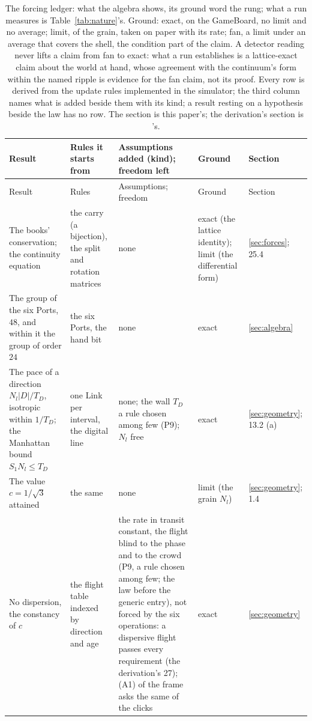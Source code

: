 {\scriptsize\setlength{\tabcolsep}{3pt}
\begin{longtable}{L{1.3in}L{1.5in}L{1.45in}L{0.85in}L{0.85in}}
\caption{\label{tab:ledger}The forcing ledger: what the algebra shows, its ground word the rung; what a run measures is Table~\ref{tab:nature}'s. Ground: exact, on the GameBoard, no limit and no average; limit, of the grain, taken on paper with its rate; fan, a limit under an average that covers the shell, the condition part of the claim. A detector reading never lifts a claim from fan to exact: what a run establishes is a lattice-exact claim about the world at hand, whose agreement with the continuum's form within the named ripple is evidence for the fan claim, not its proof. Every row is derived from the update rules implemented in the simulator; the third column names what is added beside them with its kind; a result resting on a hypothesis beside the law has no row. The section is this paper's; the derivation's section is \cite{derivations}'s.}\\
\toprule
Result & Rules it starts from & Assumptions added (kind); freedom left & Ground & Section \\
\midrule
\endfirsthead
\toprule
Result & Rules & Assumptions; freedom & Ground & Section \\
\midrule
\endhead
\bottomrule
\endlastfoot
The books' conservation; the continuity equation & the carry (a bijection), the split and rotation matrices & none & exact (the lattice identity); limit (the differential form) & \ref{sec:forces}; 25.4 \\
The group of the six Ports, $48$, and within it the group of order $24$ & the six Ports, the hand bit & none & exact & \ref{sec:algebra} \\
The pace of a direction $N_l|D|/T_D$, isotropic within $1/T_D$; the Manhattan bound $S_1 N_l \le T_D$ & one Link per interval, the digital line & none; the wall $T_D$ a rule chosen among few (P9); $N_l$ free & exact & \ref{sec:geometry}; 13.2 (a) \\
The value $c = 1/\sqrt3$ attained & the same & none & limit (the grain $N_l$) & \ref{sec:geometry}; 1.4 \\
No dispersion, the constancy of $c$ & the flight table indexed by direction and age & the rate in transit constant, the flight blind to the phase and to the crowd (P9, a rule chosen among few; the law before the generic entry), not forced by the six operations: a dispersive flight passes every requirement (the derivation's 27); (A1) of the frame asks the same of the clicks & exact & \ref{sec:geometry} \\

\end{longtable}}
